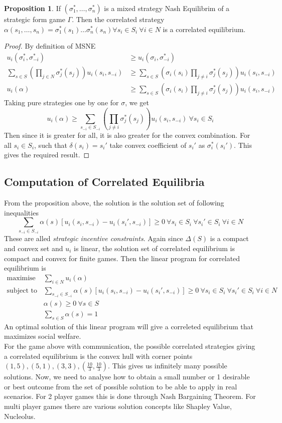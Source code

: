 \documentclass{article}
\theoremstyle{definition}
\newtheorem{prop}{Proposition}[section]
\begin{document}
\begin{prop}
If $(\sigma_1^*,\dots,\sigma_n^*)$ is a mixed strategy Nash Equilibrim of a strategic form game $\Gamma$. Then the correlated strategy $\alpha(s_1,\dots,s_n) = \sigma_1^*(s_1)\dots \sigma_n^*(s_n) \forall s_i\in S_i~\forall i\in N$ is a correlated equilibrium.
\end{prop}
\begin{proof}
By definition of MSNE
\begin{align*}
u_i(\sigma_i^*,\sigma_{-i}^*) &\geq u_i(\sigma_i,\sigma_{-i}^*)\\
\sum_{s\in S}\left(\prod_{j\in N}\sigma_j^*(s_j)\right) u_i(s_i,s_{-i}) &\geq \sum_{s\in S}\left(\sigma_i(s_i)\prod_{j\ne i}\sigma_j^*(s_j)\right) u_i(s_i,s_{-i})\\
u_i(\alpha)&\geq \sum_{s\in S}\left(\sigma_i(s_i)\prod_{j\ne i}\sigma_j^*(s_j)\right) u_i(s_i,s_{-i})
\end{align*}
Taking pure strategies one by one for $\sigma$, we get $$u_i(\alpha) \geq \sum_{s_{-i}\in S_{-i}}\left(\prod_{j\ne i}\sigma_j^*(s_j)\right) u_i(s_i,s_{-i})~\forall s_i\in S_i$$
Then since it is greater for all, it is also greater for the convex combination. For all $s_i\in S_i$, such that $\delta(s_i) = s_i'$ take convex coefficient of $s_i'$ as $\sigma_i^*(s_i')$. This gives the required result. 
\end{proof}
\subsection{Computation of Correlated Equilibria}
From the proposition above, the solution is the solution set of following inequalities
$$\sum_{s_{-i}\in S_{-i}} \alpha(s)[u_i(s_i,s_{-i}) - u_i(s_i',s_{-i})]\geq 0 ~\forall s_i\in S_i~\forall s_i'\in S_i~\forall i \in N$$
These are alled \textit{strategic incentive constraints}. Again since $\Delta(S)$ is a compact and convex set and $u_i$ is linear, the solution set of correlated equilibrium is compact and convex for finite games. Then the linear program for correlated equilibrium is
\begin{align*}
\text{maximise } & \sum_{i\in N} u_i(\alpha)\\
\text{subject to } & \sum_{s_{-i}\in S_{-i}} \alpha(s)[u_i(s_i,s_{-i}) - u_i(s_i',s_{-i})]\geq 0 ~\forall s_i\in S_i~\forall s_i'\in S_i~\forall i \in N\\
& \alpha(s)\geq 0~\forall s\in S\\
& \sum_{s\in S} \alpha(s) =1
\end{align*}
An optimal solution of this linear program will give a correleted equilibrium that maximizes social welfare.\\
For the game above with communication, the possible correlated strategies giving a correlated equilibrium is the convex hull with corner points $(1,5),(5,1),(3,3),(\frac{10}{3},\frac{10}{3})$. This gives us infinitely many possible solutions. Now, we need to analyse how to obtain a small number or 1 desirable or best outcome from the set of possible solution to be able to apply in real scenarios. For 2 player games this is done through Nash Bargaining Theorem. For multi player games there are various solution concepts like Shapley Value, Nucleolus.
\end{document}
